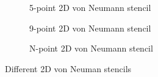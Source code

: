 \begin{figure}[ht]
	\centering
	\begin{subfigure}{.33\textwidth}
		\centering
		\caption{5-point 2D von Neumann stencil}
		\label{fig:5p2DNeu}
	\end{subfigure}%
	\begin{subfigure}{.33\textwidth}
		\centering
		\caption{9-point 2D von Neumann stencil}
		\label{fig:9p2DNeu}
	\end{subfigure}
	\begin{subfigure}{.33\textwidth}
		\centering
		\caption{N-point 2D von Neumann stencil}
		\label{fig:Np2DNeu}
	\end{subfigure}%
	\caption{Different 2D von Neuman stencils}
	\label{fig:2DvonNeu}
\end{figure}
